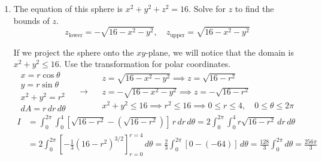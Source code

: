 \documentclass[a4paper, 12pt]{article}
\begin{document}
\begin{enumerate}[leftmargin=*,label=\textbf{\arabic*.}]
\begin{center}
\begin{minipage}{0.45\textwidth}
\end{minipage}
\begin{minipage}{0.45\textwidth}
\[\boxed{\int_0^1\int_0^{3x}dy\,dx+\int_1^2\int_0^{4-x^2}dy\,dx}\]
\end{minipage}
\end{center}

\newpage

\item The equation of this sphere is $x^2+y^2+z^2=16$. Solve for $z$ to find the bounds of $z$.
\[z_{\text{lower}}=-\sqrt{16-x^2-y^2},\quad z_{\text{upper}}=\sqrt{16-x^2-y^2}\]

If we project the sphere onto the $xy$-plane, we will notice that the domain is \linebreak $x^2+y^2\leq16$. Use the transformation for polar coordinates.
\[
\begin{array}{c}
x=r\cos\theta\\
y=r\sin\theta\\
x^2+y^2=r^2\\
dA=r\,dr\,d\theta
\end{array}\quad\rightarrow\quad
\begin{array}{c}
z=\sqrt{16-x^2-y^2}\implies z=\sqrt{16-r^2}\\[0.2cm]
z=-\sqrt{16-x^2-y^2}\implies z=-\sqrt{16-r^2}\\[0.2cm]
x^2+y^2\leq16\implies r^2\leq 16\implies 0\leq r\leq 4,\quad \displaystyle0\leq\theta\leq2\pi
\end{array} 
\]
\begin{align*}{I}&=\int_0^{2\pi}\int_0^4\left[\sqrt{16-r^2}-\left(\sqrt{16-r^2}\right)\right]\,r\,dr\,d\theta=2\int_0^{2\pi}\int_0^4r\sqrt{16-r^2}\,dr\,d\theta\\[1em]&=2\int_0^{2\pi}\left[-\frac13\left(16-r^2\right)^{3/2}\right]_{r=0}^{r=4}\,d\theta=\frac23\int_0^{2\pi}\left[0-\left(-64\right)\right]\,d\theta=\frac{128}3\int_0^{2\pi}d\theta=\boxed{\frac{256\pi}3}\end{align*}


\end{enumerate}
\end{document}
